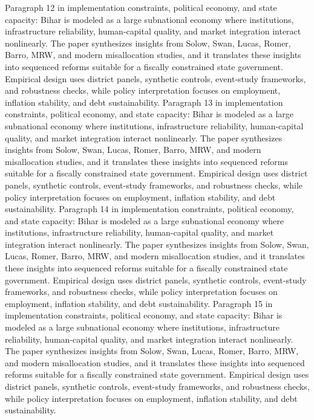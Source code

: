 \documentclass[preprint,12pt]{elsarticle}
\begin{document}
Paragraph 12 in implementation constraints, political economy, and state capacity: Bihar is modeled as a large subnational economy where institutions, infrastructure reliability, human-capital quality, and market integration interact nonlinearly. The paper synthesizes insights from Solow, Swan, Lucas, Romer, Barro, MRW, and modern misallocation studies, and it translates these insights into sequenced reforms suitable for a fiscally constrained state government. Empirical design uses district panels, synthetic controls, event-study frameworks, and robustness checks, while policy interpretation focuses on employment, inflation stability, and debt sustainability.
Paragraph 13 in implementation constraints, political economy, and state capacity: Bihar is modeled as a large subnational economy where institutions, infrastructure reliability, human-capital quality, and market integration interact nonlinearly. The paper synthesizes insights from Solow, Swan, Lucas, Romer, Barro, MRW, and modern misallocation studies, and it translates these insights into sequenced reforms suitable for a fiscally constrained state government. Empirical design uses district panels, synthetic controls, event-study frameworks, and robustness checks, while policy interpretation focuses on employment, inflation stability, and debt sustainability.
Paragraph 14 in implementation constraints, political economy, and state capacity: Bihar is modeled as a large subnational economy where institutions, infrastructure reliability, human-capital quality, and market integration interact nonlinearly. The paper synthesizes insights from Solow, Swan, Lucas, Romer, Barro, MRW, and modern misallocation studies, and it translates these insights into sequenced reforms suitable for a fiscally constrained state government. Empirical design uses district panels, synthetic controls, event-study frameworks, and robustness checks, while policy interpretation focuses on employment, inflation stability, and debt sustainability.
Paragraph 15 in implementation constraints, political economy, and state capacity: Bihar is modeled as a large subnational economy where institutions, infrastructure reliability, human-capital quality, and market integration interact nonlinearly. The paper synthesizes insights from Solow, Swan, Lucas, Romer, Barro, MRW, and modern misallocation studies, and it translates these insights into sequenced reforms suitable for a fiscally constrained state government. Empirical design uses district panels, synthetic controls, event-study frameworks, and robustness checks, while policy interpretation focuses on employment, inflation stability, and debt sustainability.
\end{document}
